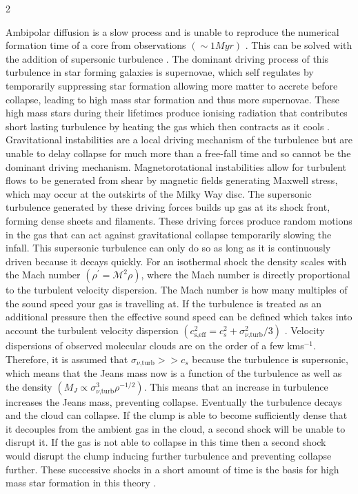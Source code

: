 \documentclass[a4paper,11pt]{article}
\begin{document}
\begin{multicols}{2}
\par\noindent Ambipolar diffusion is a slow process and is unable to reproduce the numerical formation time of a core from observations $\left(\sim1Myr\right)$ \parencite{ambipolar_timescales}. This can be solved with the addition of supersonic turbulence \parencite{turbulent_frag}. The dominant driving process of this turbulence in star forming galaxies is supernovae, which self regulates by temporarily suppressing star formation allowing more matter to accrete before collapse, leading to high mass star formation and thus more supernovae. These high mass stars during their lifetimes produce ionising radiation that contributes short lasting turbulence by heating the gas which then contracts as it cools \parencite{turbulent_thermal_instabilities}. Gravitational instabilities are a local driving mechanism of the turbulence but are unable to delay collapse for much more than a free-fall time and so cannot be the dominant driving mechanism. Magnetorotational instabilities allow for turbulent flows to be generated from shear by magnetic fields generating Maxwell stress, which may occur at the outskirts of the Milky Way disc. The supersonic turbulence generated by these driving forces builds up gas at its shock front, forming dense sheets and filaments. These driving forces produce random motions in the gas that can act against gravitational collapse temporarily slowing the infall. This supersonic turbulence can only do so as long as it is continuously driven because it decays quickly. For an isothermal shock the density scales with the Mach number $\left(\rho^{\prime} = \mathcal{M}^{2}\rho\right)$, where the Mach number is directly proportional to the turbulent velocity dispersion. The Mach number is how many multiples of the sound speed your gas is travelling at. If the turbulence is treated as an additional pressure then the effective sound speed can be defined which takes into account the turbulent velocity dispersion $(c_{\text{s,eff}}^{2} = c_{s}^{2} + \sigma_{\nu\text{,turb}}^{2}/3)$ \parencite{effective_sound_speed}. Velocity dispersions of observed molecular clouds are on the order of a few kms$^{-1}$. Therefore, it is assumed that $\sigma_{\nu\text{,turb}} >> c_{s}$ because the turbulence is supersonic, which means that the Jeans mass now is a function of the turbulence as well as the density $\left(M_J \propto \sigma_{\nu\text{,turb}}^{3}\rho^{-1/2}\right)$. This means that an increase in turbulence increases the Jeans mass, preventing collapse. Eventually the turbulence decays and the cloud can collapse. If the clump is able to become sufficiently dense that it decouples from the ambient gas in the cloud, a second shock will be unable to disrupt it. If the gas is not able to collapse in this time then a second shock would disrupt the clump inducing further turbulence and preventing collapse further. These successive shocks in a short amount of time is the basis for high mass star formation in this theory \parencite[see][]{turbulent_frag}.


\end{multicols}
\end{document}
